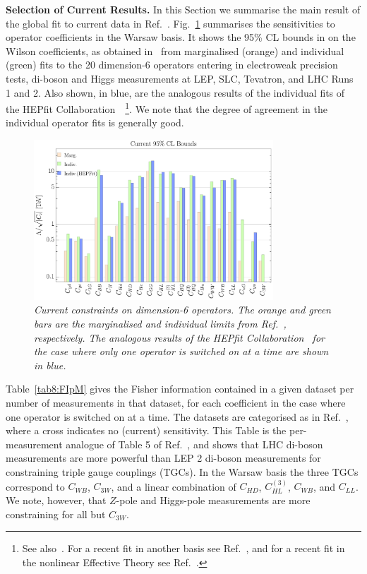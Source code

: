 \documentclass[../report.tex]{subfiles}
\begin{document}
\vspace{5mm}
\noindent
{\bf Selection of Current Results.} 
\label{sec8:curr}
In this Section we summarise the main result of the global fit to current data in Ref.~\cite{Ellis:2018gqa}. Fig.~\ref{fig8:HEPfitvsEMSY} summarises the sensitivities to operator coefficients in the Warsaw basis.
It shows the 95\% CL bounds in \UTeV on the Wilson coefficients, as obtained in~\cite{Ellis:2018gqa} from marginalised (orange) and individual (green) fits to the 20 dimension-6 operators 
entering in electroweak precision tests, di-boson and Higgs measurements at LEP, SLC, Tevatron, and LHC Runs 1 and 2.
Also shown, in blue, are the analogous results of the individual fits of the HEPfit Collaboration~\cite{Ciuchini:2013pca, deBlas:2016ojx}~\footnote{See 
also~\cite{luca:talk, otto:talk}. For a recent fit in another basis see Ref.~\cite{Alves:2018nof}, and
for a recent fit in the nonlinear Effective Theory see Ref.~\cite{deBlas:2018tjm}.}. 
We note that the degree of agreement in the individual operator fits is generally good. 


\begin{figure}
  \centering
\includegraphics[width=0.8\textwidth]{section8/plots/barcompcnorm.pdf}
\vspace{-0.2cm}
 \caption{\it Current constraints on dimension-6 operators. The orange and green bars are the marginalised and individual limits from Ref.~\cite{Ellis:2018gqa}, respectively. 
 The analogous results of the HEPfit Collaboration~\cite{Ciuchini:2013pca, deBlas:2016ojx} for the case where only one operator is switched on at a time are shown in blue.}
   \label{fig8:HEPfitvsEMSY}
\end{figure} 

Table~\ref{tab8:FIpM} gives the Fisher information contained in a given dataset per number of measurements in that dataset,
for each coefficient in the case where one operator is switched on at a time.
The datasets are categorised as in Ref.~\cite{Ellis:2018gqa}, where a
cross indicates no (current) sensitivity.
This Table is the per-measurement analogue of Table 5 of Ref.~\cite{Ellis:2018gqa}, and
shows that LHC di-boson measurements are more powerful than LEP 2 di-boson measurements for constraining triple gauge couplings (TGCs).
In the Warsaw basis the three TGCs correspond to $C_{WB}$, $C_{3W}$, and a linear combination of $C_{HD}$, $C_{HL}^{(3)}$, $C_{WB}$, and $C_{LL}$.
We note, however, that $Z$-pole and Higgs-pole measurements are more constraining for all but $C_{3W}$. 
\end{document}
